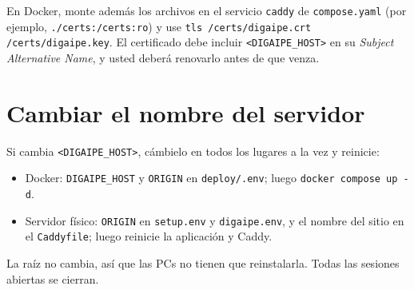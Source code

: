 En Docker, monte además los archivos en el servicio \texttt{caddy} de \texttt{compose.yaml}
(por ejemplo, \texttt{./certs:/certs:ro}) y use \texttt{tls /certs/digaipe.crt
/certs/digaipe.key}. El certificado debe incluir \texttt{<DIGAIPE\_HOST>} en su
\emph{Subject Alternative Name}, y usted deberá renovarlo antes de que venza.

\section{Cambiar el nombre del servidor}
\label{sec:cambiar-host}

Si cambia \texttt{<DIGAIPE\_HOST>}, cámbielo en todos los lugares a la vez y reinicie:

\begin{itemize}
	\item Docker: \texttt{DIGAIPE\_HOST} y \texttt{ORIGIN} en \texttt{deploy/.env}; luego
	      \texttt{docker compose up -d}.
	\item Servidor físico: \texttt{ORIGIN} en \texttt{setup.env} y \texttt{digaipe.env}, y el
	      nombre del sitio en el \texttt{Caddyfile}; luego reinicie la aplicación y Caddy.
\end{itemize}

La raíz no cambia, así que las PCs no tienen que reinstalarla. Todas las sesiones abiertas se
cierran.
